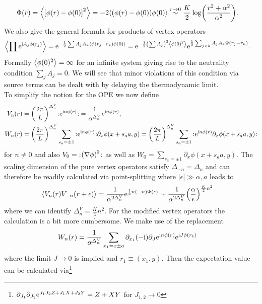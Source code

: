 \documentclass[english, parskip=full]{scrartcl}
\begin{document}
\begin{align}
\Phi(r) &= \bra*{\klb*{\phi(r) - \phi(0)}^2} = -2 \bra*{\kla*{\phi(r) - \phi(0)} \phi(0)} \overset{r\rightarrow 0}{\sim} \frac{K}{2} \log\kla*{\frac{r^2 + \alpha^2}{\alpha^2}}.
\end{align}
We also give the general formula for products of vertex operators
\begin{align}
\bra*{\prod \powe{\i A_j\phi(r_j)}} &= \powe{-\frac{1}{2} \sum A_j A_k \bra*{\phi(r_j-r_k) \phi(0)}} = \powe{-\frac{1}{2} \kla*{\sum A_j}^2 \bra*{\phi(0)^2}} \powe{\frac{1}{2} \sum_{j<k} A_jA_k \Phi(r_j-r_k)}.
\end{align}
Formally $\bra*{\phi(0)^2}=\infty$ for an infinite system giving rise to the neutrality condition $\sum_j A_j =0$.
We will see that minor violations of this condition via source terms can be dealt with by delaying the thermodynamic limit.\\
To simplify the notion for the OPE we now define
\begin{align}
V_n(r) &= \kla*{\frac{2\pi}{L}}^{\Delta^V_n} \normord{\powe{\i n\phi(r)}} = \frac{1}{\alpha^{\Delta^V_n}} \powe{\i n\phi(r)},\\
W_n(r) &= \kla*{\frac{2\pi}{L}}^{\Delta^V_n} \sum_{s_a=\pm 1} \normord{\powe{\i n\phi(r)}} \partial_x\phi(x+s_aa,y) = \kla*{\frac{2\pi}{L}}^{\Delta^V_n} \sum_{s_a=\pm 1} \normord{\powe{\i n\phi(r)} \partial_x\phi(x+s_aa,y)}
\end{align}
for $n\neq 0$ and also $V_0 = \normord{\kla*{\nabla\phi}^2}$ as well as $W_0 = \sum_{s_a=\pm 1} \partial_x\phi(x+s_aa,y)$.
The scaling dimension of the pure vertex operators satisfy $\Delta_{-n} = \Delta_n$ and can therefore be readily calculated via point-splitting where $|\epsilon|\gg \alpha, a$ leads to
\begin{align}
\bra*{V_n(r) V_{-n}(r+\epsilon)} &= \frac{1}{\alpha^{2\Delta^V_n}} \powe{\frac{1}{2} n(-n) \Phi(\epsilon)} \sim \frac{1}{\alpha^{2\Delta^V_n}} \kla*{\frac{\alpha}{\epsilon}}^{\frac{K}{2}n^2}
\end{align}
where we can identify $\Delta^V_n = \frac{K}{4}n^2$.
For the modified vertex operators the calculation is a bit more cumbersome.
We make use of the replacement
\begin{align}
W_n(r) &= \frac{1}{\alpha^{\Delta^V_n}} \sum_{x_1=x\pm a} \partial_{x_1} (-\i) \partial_J \powe{\i n\phi(r)} \powe{\i J \phi(r_1)}
\end{align}
where the limit $J\rightarrow 0$ is implied and $r_1 \equiv(x_1,y)$.
Then the expectation value can be calculated via\footnote{$\partial_{J_1} \partial_{J_2} \powe{J_1J_2Z + J_1X + J_2Y} = Z + XY$ for $J_{1,2}\rightarrow 0$}
\end{document}
